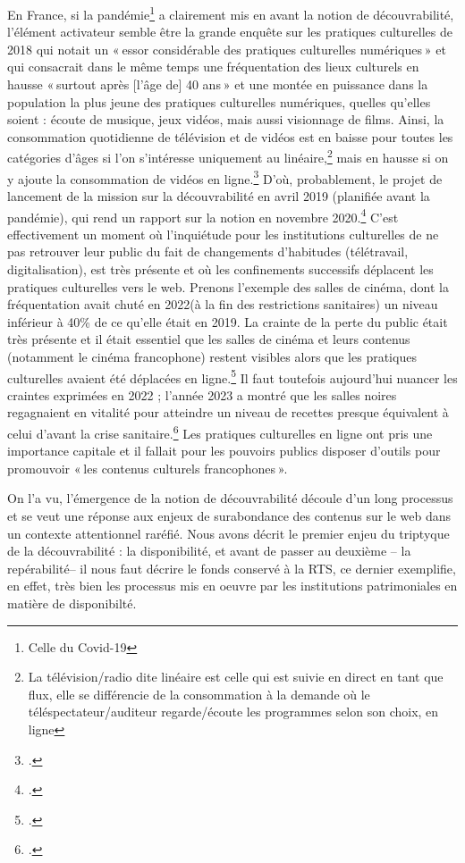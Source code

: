 En France, si la pandémie\footnote{Celle du Covid-19} a clairement mis en avant la notion de découvrabilité, l’élément activateur semble être la grande enquête sur les pratiques culturelles de 2018 qui notait un « essor considérable des pratiques culturelles numériques » et qui consacrait dans le même temps une fréquentation des lieux culturels en hausse « surtout après [l’âge de] 40 ans » et une montée en puissance dans la population la plus jeune des pratiques culturelles numériques, quelles qu’elles soient : écoute de musique, jeux vidéos, mais aussi visionnage de films. Ainsi, la consommation quotidienne de télévision et de vidéos est en baisse pour toutes les catégories d’âges si l’on s’intéresse uniquement au linéaire,\footnote{La télévision/radio dite linéaire est celle qui est suivie en direct en tant que flux, elle se différencie de la consommation à la demande où le téléspectateur/auditeur regarde/écoute les programmes selon son choix, en ligne} mais en hausse si on y ajoute la consommation de vidéos en ligne.\footcite[p. 24]{2020b} D’où, probablement, le projet de lancement de la mission sur la découvrabilité en avril 2019 (planifiée avant la pandémie), qui rend un rapport sur la notion en novembre 2020.\footcite{zotero-263} C’est effectivement un moment où l’inquiétude pour les institutions culturelles de ne pas retrouver leur public du fait de changements d’habitudes (télétravail, digitalisation), est très présente et où les confinements successifs déplacent les pratiques culturelles vers le web. Prenons l’exemple des salles de cinéma, dont la fréquentation avait chuté en 2022(à la fin des restrictions sanitaires) un niveau inférieur à 40\% de ce qu’elle était en 2019. La crainte de la perte du public était très présente et il était essentiel que les salles de cinéma et leurs contenus (notamment le cinéma francophone) restent visibles alors que les pratiques culturelles avaient été déplacées en ligne.\footcite[§1 et §2]{muller2022} Il faut toutefois aujourd’hui nuancer les craintes exprimées en 2022 ; l’année 2023 a montré que les salles noires regagnaient en vitalité pour atteindre un niveau de recettes presque équivalent à celui d’avant la crise sanitaire.\footcite{2024m} Les pratiques culturelles en ligne ont pris une importance capitale et il fallait pour les pouvoirs publics disposer d’outils pour promouvoir « les contenus culturels francophones ».

On l’a vu, l’émergence de la notion de découvrabilité découle d’un long processus et se veut une réponse aux enjeux de surabondance des contenus sur le web dans un contexte attentionnel raréfié. Nous avons décrit le premier enjeu du triptyque de la découvrabilité : la disponibilité, et avant de passer au deuxième – la repérabilité– il nous faut décrire le fonds conservé à la RTS, ce dernier exemplifie, en effet, très bien les processus mis en oeuvre par les institutions patrimoniales en matière de disponibilté. 

